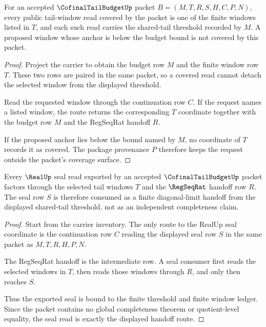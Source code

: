 \begin{theorem}
\label{thm:cofinal-tail-budget-window-coverage}
For an accepted $\CofinalTailBudgetUp$ packet $B=(M,T,R,S,H,C,P,N)$, every public tail-window read covered by the packet is one of the finite windows listed in $T$, and each such read carries the shared-tail threshold recorded by $M$. A proposed window whose anchor is below the budget bound is not covered by this packet.
\end{theorem}
\begin{proof}
Project the carrier to obtain the budget row $M$ and the finite window row $T$. These two rows are paired in the same packet, so a covered read cannot detach the selected window from the displayed threshold.

Read the requested window through the continuation row $C$. If the request names a listed window, the route returns the corresponding $T$ coordinate together with the budget row $M$ and the RegSeqRat handoff $R$.

If the proposed anchor lies below the bound named by $M$, no coordinate of $T$ records it as covered. The package provenance $P$ therefore keeps the request outside the packet's coverage surface.
\end{proof}

\begin{theorem}
\label{thm:cofinal-tail-budget-real-seal-handoff}
Every $\RealUp$ seal read exported by an accepted $\CofinalTailBudgetUp$ packet factors through the selected tail windows $T$ and the $\RegSeqRat$ handoff row $R$. The seal row $S$ is therefore consumed as a finite diagonal-limit handoff from the displayed shared-tail threshold, not as an independent completeness claim.
\end{theorem}
\begin{proof}
Start from the carrier inventory. The only route to the RealUp seal coordinate is the continuation row $C$ reading the displayed seal row $S$ in the same packet as $M,T,R,H,P,N$.

The RegSeqRat handoff is the intermediate row. A seal consumer first reads the selected windows in $T$, then reads those windows through $R$, and only then reaches $S$.

Thus the exported seal is bound to the finite threshold and finite window ledger. Since the packet contains no global completeness theorem or quotient-level equality, the seal read is exactly the displayed handoff route.
\end{proof}

